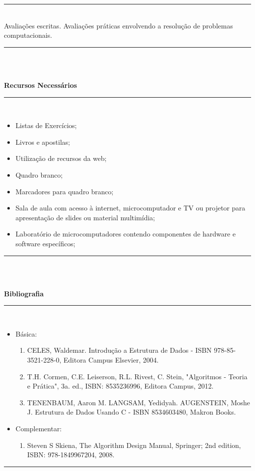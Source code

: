 \noindent\rule{16.5cm}{0.4pt}
\\
   Avaliações escritas. Avalia\c{c}\~oes pr\'aticas envolvendo a resolu\c{c}\~ao de problemas computacionais.\\
\noindent\rule{16.5cm}{0.4pt}\\
\\
\vspace{-12mm}
\begin{center}\textbf{Recursos Necessários}\end{center}
\vspace{-5mm}
\noindent\rule{16.5cm}{0.4pt}
\\
\begin{itemize} 
  \item Listas de Exercícios;
  \item Livros e apostilas;
  \item Utilização de recursos da web;
  \item Quadro branco;
  \item Marcadores para quadro branco;
  \item Sala de aula com acesso à internet, microcomputador e TV ou projetor para apresentação de slides ou material multimídia;
  \item Laboratório de microcomputadores contendo componentes de hardware e software específicos;
\end{itemize}
\noindent\rule{16.5cm}{0.4pt}\\
\\
\vspace{-12mm}
\begin{center}\textbf{Bibliografia}\end{center}
\vspace{-5mm}
\noindent\rule{16.5cm}{0.4pt}
\\
\begin{itemize} 
  \item Básica:
	\begin{enumerate}
	\item CELES, Waldemar. Introdução a Estrutura de Dados -  ISBN 978-85-3521-228-0, Editora Campus Elsevier, 2004.
	\item T.H. Cormen, C.E. Leiserson, R.L. Rivest, C. Stein, "Algoritmos - Teoria e Prática", 3a. ed., ISBN: 8535236996, Editora Campus, 2012.
	\item TENENBAUM, Aaron M. LANGSAM, Yedidyah. AUGENSTEIN, Moshe J. Estrutura de Dados Usando C - ISBN 8534603480, Makron Books. 
	
	\end{enumerate}
  \item Complementar:
	\begin{enumerate} 
	\item Steven S Skiena, The Algorithm Design Manual, Springer; 2nd edition, ISBN: 978-1849967204, 2008.\\
	\end{enumerate}
\end{itemize}
\noindent\rule{16.5cm}{0.4pt}\\
\\

